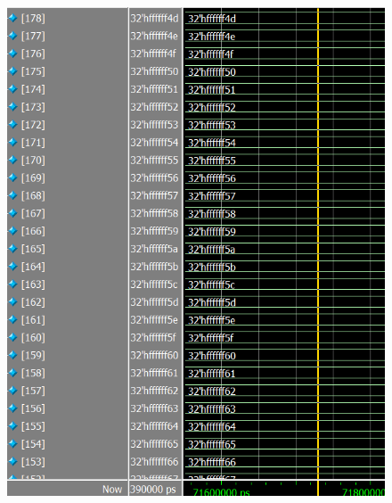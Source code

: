 \documentclass[conference]{IEEEtran}
\begin{document}
	\begin{figure}[H]
		\centering
		\includegraphics[width=\columnwidth]{Files/full_mem_val3}
		\caption{}
		\label{fig:fullmemval3}
	\end{figure}
	
\end{document}
